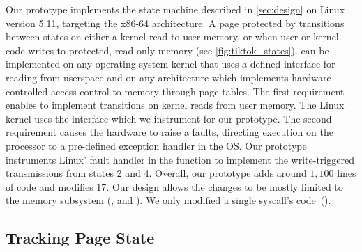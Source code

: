 \documentclass[letterpaper,twocolumn,10pt]{article}
\begin{document}
Our \tiktok prototype implements the state machine described in 
\autoref{sec:design} on Linux version 5.11, targeting the x86-64 
architecture. 
A page protected by \tiktok transitions between states on 
either a kernel read to user memory, or when user or kernel code
writes to protected, read-only memory (see \autoref{fig:tiktok_states}).
\tiktok can be implemented on any operating system kernel that uses 
a defined interface for reading from userspace and
on any architecture which implements hardware-controlled access 
control to memory through page tables. 
The first requirement enables \tiktok to implement transitions on 
kernel reads from user memory.
The Linux kernel uses the  interface which 
we instrument for our prototype.
The second requirement causes the hardware to raise a faults, 
directing execution on the processor to a pre-defined exception 
handler in the OS.
Our prototype instruments Linux' fault handler in the function 
 to implement the write-triggered transmissions 
from states 2 and 4.
Overall, our prototype adds around $1,100$ lines of code and modifies 
17. 
Our design allows the changes to be mostly limited to the memory 
subsystem (,  and 
).
We only modified a single syscall's code~().


\subsection{Tracking Page State}
\end{document}
